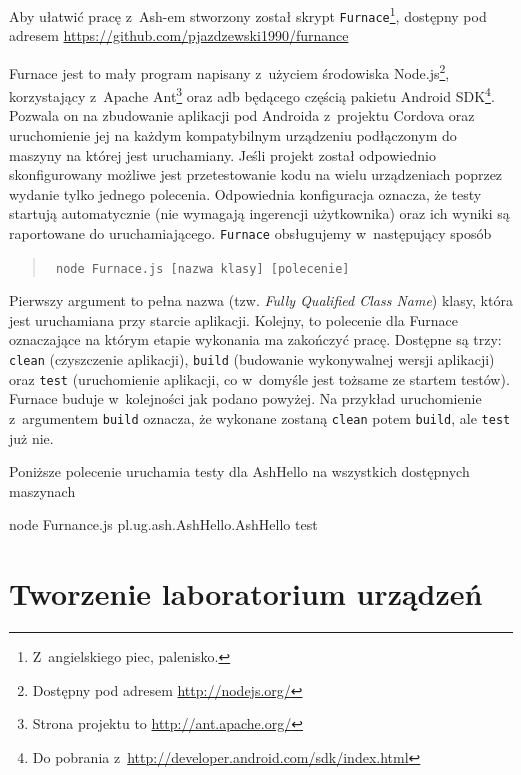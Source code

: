 \documentclass[brudnopis]{xmgr}
\begin{document}
Aby ułatwić pracę z~Ash-em stworzony został skrypt \texttt{Furnace}\footnote{Z~angielskiego piec, palenisko.}, dostępny pod adresem \url{https://github.com/pjazdzewski1990/furnance}

Furnace jest to mały program napisany z~użyciem środowiska Node.js\footnote{Dostępny pod adresem \url{http://nodejs.org/} }, korzystający z~Apache Ant\footnote{Strona projektu to  \url{http://ant.apache.org/} } oraz adb będącego częścią pakietu Android SDK\footnote{Do pobrania z~\url{http://developer.android.com/sdk/index.html} }. Pozwala on na zbudowanie aplikacji pod Androida z~projektu Cordova oraz uruchomienie jej na każdym kompatybilnym urządzeniu podłączonym do maszyny na której jest uruchamiany. Jeśli projekt został odpowiednio skonfigurowany możliwe jest przetestowanie kodu na wielu urządzeniach poprzez wydanie tylko jednego polecenia. Odpowiednia konfiguracja oznacza, że testy startują automatycznie (nie wymagają ingerencji użytkownika) oraz ich wyniki są raportowane do uruchamiającego. \texttt{Furnace} obsługujemy w~następujący sposób

\begin{quote}
	\texttt{ node Furnace.js [nazwa klasy] [polecenie] }
\end{quote}

Pierwszy argument to pełna nazwa (tzw. \textit{Fully Qualified Class Name}) klasy, która jest uruchamiana przy starcie aplikacji.  Kolejny, to polecenie dla Furnace oznaczające na którym etapie wykonania ma zakończyć pracę. Dostępne są trzy: \texttt{clean} (czyszczenie aplikacji), \texttt{build} (budowanie wykonywalnej wersji aplikacji) oraz \texttt{test} (uruchomienie aplikacji, co w~domyśle jest tożsame ze startem testów). Furnace buduje w~kolejności jak podano powyżej. Na przykład uruchomienie z~argumentem \texttt{build} oznacza, że wykonane zostaną \texttt{clean} potem \texttt{build}, ale \texttt{test} już nie.

Poniższe polecenie uruchamia testy dla AshHello na wszystkich dostępnych maszynach 

\begin{javascriptcode}
	node Furnance.js pl.ug.ash.AshHello.AshHello test
\end{javascriptcode}

\section{Tworzenie laboratorium urządzeń}
\end{document}
